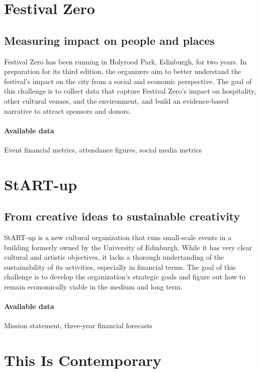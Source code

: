 \documentclass[11pt,a4paper]{article}
\begin{document}
\pagestyle{empty}

\section*{Festival Zero \hrulefill}
\subsection*{Measuring impact on people and places}

Festival Zero has been running in Holyrood Park, Edinburgh, for two years. In preparation for its third edition, the organizers aim to better understand the festival's impact on the city from a social and economic perspective. The goal of this challenge is to collect data that capture Festival Zero's impact on hospitality, other cultural venues, and the environment, and build an evidence-based narrative to attract sponsors and donors.
\paragraph{Available data} Event financial metrics, attendance figures, social media metrics

\vfill

\section*{StART-up \hrulefill}
\subsection*{From creative ideas to sustainable creativity}

StART-up is a new cultural organization that runs small-scale events in a building formerly owned by the University of Edinburgh. While it has very clear cultural and artistic objectives, it lacks a thorough undertanding of the sustainability of its activities, especially in financial terms. The goal of this challenge is to develop the organization's strategic goals and figure out how to remain economically viable in the medium and long term.
\paragraph{Available data} Mission statement, three-year financial forecasts

\vfill

\section*{This Is Contemporary \hrulefill}
\end{document}
